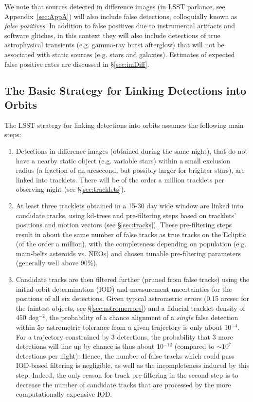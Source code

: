 We note that sources detected in difference images (\DIASources in LSST parlance, see Appendix~\ref{sec:AppA})
will also include false detections, colloquially known as {\it false positives}.
In addition to false positives due to instrumental artifacts and software glitches,
in this context they will also include detections of true astrophysical transients
(e.g. gamma-ray burst afterglow) that will not be associated with static sources
(e.g. stars and galaxies). Estimates of expected false positive rates are discussed
in \S\ref{sec:imDiff}.



\subsection{The Basic Strategy for Linking Detections into Orbits}

The LSST strategy for linking detections into orbits assumes the following main steps:
\begin{enumerate}
\item Detections in difference images (obtained during the same night), that do not
         have a nearby static object (e.g. variable stars) within a small exclusion radius
         (a fraction of an arcsecond, but possibly larger for brighter stars), are linked into tracklets. There will be of the order
         a million tracklets per observing night (see \S\ref{sec:tracklets}).
\item At least three tracklets obtained in a 15-30 day wide window are linked into
         candidate tracks, using kd-trees and pre-filtering steps based on tracklets' positions
         and motion vectors (see \S\ref{sec:tracks}). These pre-filtering steps result in
         about the same number of false tracks as true tracks on the Ecliptic (of the order
         a million), with the completeness depending on population (e.g. main-belts
         asteroids vs. NEOs) and chosen tunable pre-filtering parameters (generally well above 90\%).
\item Candidate tracks are then filtered further (pruned from false tracks) using the initial orbit
         determination (IOD) and measurement uncertainties for the positions of all six
         detections. Given typical astrometric errors (0.15 arcsec for the faintest objects,
         see \S\ref{sec:astromerrors})
         and a fiducial tracklet density of 450 deg$^{-2}$, the probability of a chance alignment
         of a {\it single} false detection within $5\sigma$ astrometric tolerance from a given
         trajectory is only about 10$^{-4}$. For a trajectory constrained by 3 detections, the
         probability that 3 more detections will line up by chance is thus about 10$^{-12}$ (compared to $\sim 10^7$ detections per night). Hence,
         the number of false tracks which could pass IOD-based filtering is negligible, as well as
         the incompleteness induced by this step. Indeed, the only reason for track pre-filtering
         in the second step is to decrease the number of candidate tracks that are processed
         by the more computationally expensive IOD.
\end{enumerate}

